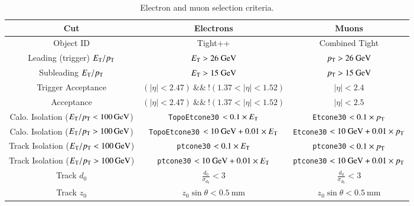 \begin{table}[h]
	\tiny
	\centering
		\begin{tabular}{ccc}
			Cut & Electrons & Muons \\
			\hline
			Object ID & Tight++ & Combined Tight \\
			Leading (trigger) $E_{\text{T}}/p_{\text{T}}$ & $E_{\text{T}}>26~\mbox{GeV}$ & $p_{\text{T}}>26~\mbox{GeV}$ \\
			Subleading $E_{\text{T}}/p_{\text{T}}$ & $E_{\text{T}}>15~\mbox{GeV}$ & $p_{\text{T}}>15~\mbox{GeV}$ \\
			Trigger Acceptance & $(|\eta|<2.47)\ \&\&\ !(1.37<|\eta|<1.52)$ & $|\eta|<2.4$ \\
			Acceptance & $(|\eta|<2.47)\ \&\&\ !(1.37<|\eta|<1.52)$ & $|\eta|<2.5$ \\
			Calo. Isolation ($E_{\text{T}}/p_{\text{T}}<\SI{100}{\giga\electronvolt}$) & \verb.TopoEtcone30. $<0.1\times E_{\text{T}}$  & \verb.Etcone30. $<0.1\times p_{\text{T}}$ \\
			Calo. Isolation ($E_{\text{T}}/p_{\text{T}}>\SI{100}{\giga\electronvolt}$) & \verb.TopoEtcone30. $<10~\mbox{GeV}+0.01\times E_{\text{T}}$ & \verb.Etcone30. $<10~\mbox{GeV}+0.01\times p_{\text{T}} $ \\
			Track Isolation ($E_{\text{T}}/p_{\text{T}}<\SI{100}{\giga\electronvolt}$) & \verb.ptcone30. $< 0.1\times E_{\text{T}} $ & \verb.ptcone30. $<0.1\times p_{\text{T}}$ \\
			Track Isolation ($E_{\text{T}}/p_{\text{T}}>\SI{100}{\giga\electronvolt}$) & \verb.ptcone30. $<10~\mbox{GeV}+0.01\times E_{\text{T}}$ & \verb.ptcone30. $<10~\mbox{GeV}+0.01\times p_{\text{T}} $ \\
			Track $d_0$ & $\frac{d_0}{\sigma_{d_0}}<3$  & $\frac{d_0}{\sigma_{d_0}}<3$  \\
			Track $z_0$ & $z_0\sin\theta<0.5~\mbox{mm}$ & $z_0\sin\theta<0.5~\mbox{mm}$  \\
		\end{tabular}
	\caption{Electron and muon selection criteria.}
	\label{table:electron-muon-selections}
\end{table}

